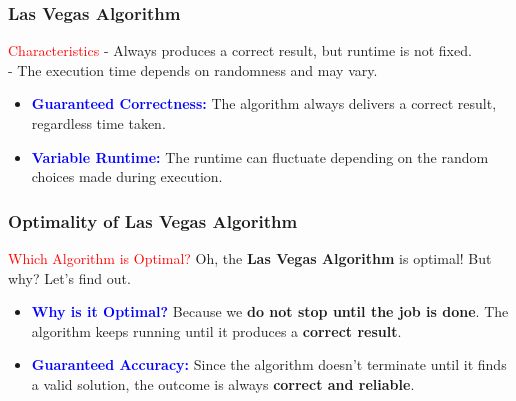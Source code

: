 \begin{frame}
    \frametitle{Las Vegas Algorithm}
    \vspace{0.4cm} %
    
    \begin{block}{\textcolor{red}{Characteristics}}
        - Always produces a correct result, but runtime is not fixed. \\
        - The execution time depends on randomness and may vary.
    \end{block}
    \vspace{0.4cm} %

    \begin{itemize}
        \item \textbf{\textcolor{blue}{Guaranteed Correctness:}} 
        The algorithm always delivers a correct result, regardless time taken.
        \vspace{0.3cm} %
        
        \item \textbf{\textcolor{blue}{Variable Runtime:}} 
        The runtime can fluctuate depending on the random choices made during execution.
    \end{itemize}
    
    \vspace{0.5cm} %
\end{frame}


\begin{frame}
    \frametitle{Optimality of Las Vegas Algorithm}
    \vspace{0.4cm} %

    \begin{block}{\textcolor{red}{Which Algorithm is Optimal?}}
        Oh, the \textbf{Las Vegas Algorithm} is optimal! But why? Let’s find out.
    \end{block}
    \vspace{0.4cm} %

    \begin{itemize}
        \item \textbf{\textcolor{blue}{Why is it Optimal?}} 
        Because we \textbf{do not stop until the job is done}. The algorithm keeps running until it produces a \textbf{correct result}.
        \vspace{0.3cm} %
        
        \item \textbf{\textcolor{blue}{Guaranteed Accuracy:}} 
        Since the algorithm doesn’t terminate until it finds a valid solution, the outcome is always \textbf{correct and reliable}.
    \end{itemize}
    
    \vspace{0.5cm} %
\end{frame}


